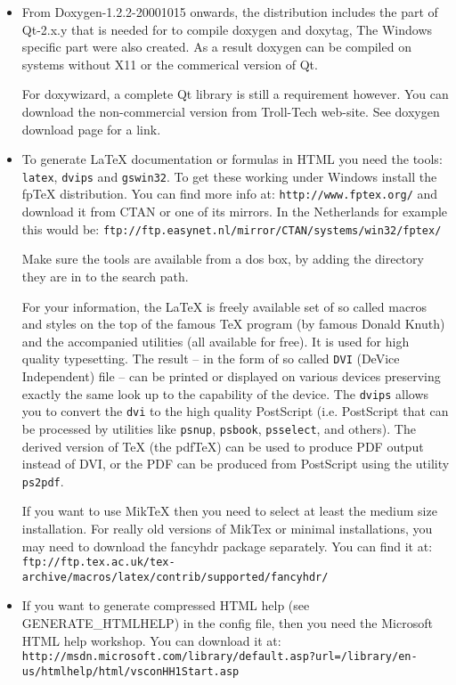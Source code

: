 \begin{itemize}
\item From Doxygen-1.2.2-20001015 onwards, the distribution includes the part of Qt-2.x.y that is needed for to compile doxygen and doxytag, The Windows specific part were also created. As a result doxygen can be compiled on systems without X11 or the commerical version of Qt.

For doxywizard, a complete Qt library is still a requirement however. You can download the non-commercial version from Troll-Tech web-site. See doxygen download page for a link.

\item To generate La\-Te\-X documentation or formulas in HTML you need the tools: {\tt latex}, {\tt dvips} and {\tt gswin32}. To get these working under Windows install the fp\-Te\-X distribution. You can find more info at: {\tt http://www.fptex.org/} and download it from CTAN or one of its mirrors. In the Netherlands for example this would be: {\tt ftp://ftp.easynet.nl/mirror/CTAN/systems/win32/fptex/}

Make sure the tools are available from a dos box, by adding the directory they are in to the search path.

For your information, the La\-Te\-X is freely available set of so called macros and styles on the top of the famous Te\-X program (by famous Donald Knuth) and the accompanied utilities (all available for free). It is used for high quality typesetting. The result -- in the form of so called {\tt DVI} (De\-Vice Independent) file -- can be printed or displayed on various devices preserving exactly the same look up to the capability of the device. The {\tt dvips} allows you to convert the {\tt dvi} to the high quality Post\-Script (i.e. Post\-Script that can be processed by utilities like {\tt psnup}, {\tt psbook}, {\tt psselect}, and others). The derived version of Te\-X (the pdf\-Te\-X) can be used to produce PDF output instead of DVI, or the PDF can be produced from Post\-Script using the utility {\tt ps2pdf}.

If you want to use Mik\-Te\-X then you need to select at least the medium size installation. For really old versions of Mik\-Tex or minimal installations, you may need to download the fancyhdr package separately. You can find it at: {\tt ftp://ftp.tex.ac.uk/tex-archive/macros/latex/contrib/supported/fancyhdr/}

\item If you want to generate compressed HTML help (see GENERATE\_\-HTMLHELP) in the config file, then you need the Microsoft HTML help workshop. You can download it at: {\tt http://msdn.microsoft.com/library/default.asp?url=/library/en-us/htmlhelp/html/vscon\-HH1Start.asp}


\end{itemize}

